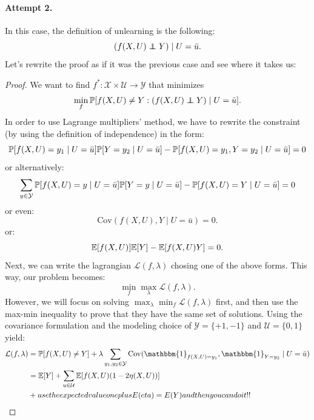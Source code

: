 {\paragraph{Attempt 2.} In this case, the definition of unlearning is the following:
$$(f(X,U)\indep Y) \mid U=\bar{u} .$$
Let's rewrite the proof as if it was the previous case and see where it takes us:
\begin{proof}
    We want to find $f^*:\mathcal{X}\times\mathcal{U}\to\mathcal{Y}$ that minimizes
    $$ \min_{f} \P[f(X,U)\neq Y : (f(X,U)\indep Y) \mid U=\bar{u}] .$$
    In order to use Lagrange multipliers' method, we have to rewrite the constraint (by using the definition of independence) in the form:
    \begin{equation}
    \P[f(X,U)=y_1 \mid U=\bar{u}]\P[Y=y_2 \mid U=\bar{u}] - \P[f(X,U)=y_1, Y=y_2 \mid U=\bar{u}] = 0
    \end{equation}
    or alternatively:
    \begin{equation}
    \sum_{y\in\mathcal{Y}}\P[f(X,U)=y \mid U=\bar{u}]\P[Y=y \mid U=\bar{u}] - \P[f(X,U)=Y \mid U=\bar{u}] = 0
    \end{equation}
    or even:
    \begin{equation}
        \mathrm{Cov}(f(X,U),Y \mid U=\bar{u}) = 0 .
    \end{equation}
    or:
    \begin{equation}
        \E[f(X,U)]\E[Y] - \E[f(X,U)Y] = 0 .
    \end{equation}
    Next, we can write the lagrangian $\mathcal{L}(f,\lambda)$ chosing one of the above forms.
    This way, our problem becomes:
    $$ \min_f \max_\lambda \mathcal{L}(f,\lambda) .$$
    However, we will focus on solving $\max_\lambda \min_f \mathcal{L}(f,\lambda)$ first, and then use the max-min inequality to prove that they have the same set of solutions.
    Using the covariance formulation and the modeling choice of $\mathcal{Y}=\{+1,-1\}$ and $\mathcal{U}=\{0,1\}$ yield:
    \begin{equation}
        \begin{split}
            \mathcal{L}(f,\lambda) &= \P[f(X,U) \neq Y] + \lambda\sum_{y_1,y_2\in\mathcal{Y}}\mathrm{Cov}(\mathbbm{1}_{f(X,U)=y_1},\mathbbm{1}_{Y=y_2} \mid U=\bar{u}) \\
            &= \E[Y] +\sum_{u\in\mathcal{U}}\E[f(X,U)(1-2\eta(X,U))] \\
            &+ use the expected value one plus E(eta) = E(Y) and then you can do it!!
        \end{split}
    \end{equation}
\end{proof} 

}